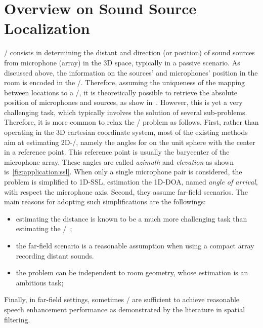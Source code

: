\section{Overview on Sound Source Localization}\label{sec:application:localization}
\SSLdef/ consists in determining the distant and direction (or position) of sound sources from microphone (array) in the 3D space, typically in a passive scenario.
As discussed above, the information on the sources' and microphones' position in the room is encoded in the \RIRs/.
Therefore, assuming the uniqueness of the mapping between locations to a \RIR/, it is theoretically possible to retrieve the absolute position of microphones and sources, as show in~.
However,  this is yet a very challenging task, which typically involves the solution of several sub-problems.
Therefore, it is more common to relax the \SSL/ problem as follows.
First, rather than operating in the  3D cartesian coordinate system, most of the existing methods aim at estimating 2D-\DOAdef/, namely the angles for on the unit sphere with the center in a reference point.
This reference point is usually the barycenter of the microphone array.
These angles are called \textit{azimuth} and \textit{elevation} as shown is~\cref{fig:application:ssl}.
When only a single microphone pair is considered, the problem is simplified to 1D-\ac{SSL}, estimation the 1D-\ac{DOA}, named \textit{angle of arrival}, with respect the microphone axis.
Second, they assume far-field scenarios.
The main reasons for adopting such simplifications are the followings:
\begin{itemize}
    \item estimating the distance is known to be a much more challenging task than estimating the \DOAs/~;
    \item the far-field scenario is a reasonable assumption when using a compact array recording distant sounds.
    \item the problem can be independent to room geometry, whose estimation is an ambitious task;
\end{itemize}
Finally, in far-field settings, sometimes \DOAs/ are sufficient to achieve reasonable speech enhancement performance as demonstrated by the literature in spatial filtering.

